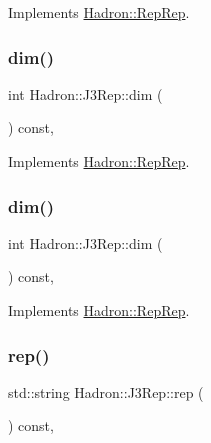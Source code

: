 Implements \mbox{\hyperlink{structHadron_1_1RepRep_a92c8802e5ed7afd7da43ccfd5b7cd92b}{Hadron\+::\+Rep\+Rep}}.

\mbox{\label{structHadron_1_1J3Rep_ab2c01ddb7d42f7ce131a9e07f0a6703d}} 
\subsubsection{\texorpdfstring{dim()}{dim()}\hspace{0.1cm}{\footnotesize\ttfamily [2/3]}}
{\footnotesize\ttfamily int Hadron\+::\+J3\+Rep\+::dim (\begin{DoxyParamCaption}{ }\end{DoxyParamCaption}) const\hspace{0.3cm}{\ttfamily [inline]}, {\ttfamily [virtual]}}



Implements \mbox{\hyperlink{structHadron_1_1RepRep_a92c8802e5ed7afd7da43ccfd5b7cd92b}{Hadron\+::\+Rep\+Rep}}.

\mbox{\label{structHadron_1_1J3Rep_ab2c01ddb7d42f7ce131a9e07f0a6703d}} 
\subsubsection{\texorpdfstring{dim()}{dim()}\hspace{0.1cm}{\footnotesize\ttfamily [3/3]}}
{\footnotesize\ttfamily int Hadron\+::\+J3\+Rep\+::dim (\begin{DoxyParamCaption}{ }\end{DoxyParamCaption}) const\hspace{0.3cm}{\ttfamily [inline]}, {\ttfamily [virtual]}}



Implements \mbox{\hyperlink{structHadron_1_1RepRep_a92c8802e5ed7afd7da43ccfd5b7cd92b}{Hadron\+::\+Rep\+Rep}}.

\mbox{\label{structHadron_1_1J3Rep_ab890e5844d6c221d555b2049711e89a6}} 
\subsubsection{\texorpdfstring{rep()}{rep()}\hspace{0.1cm}{\footnotesize\ttfamily [1/3]}}
{\footnotesize\ttfamily std\+::string Hadron\+::\+J3\+Rep\+::rep (\begin{DoxyParamCaption}{ }\end{DoxyParamCaption}) const\hspace{0.3cm}{\ttfamily [inline]}, {\ttfamily [virtual]}}



